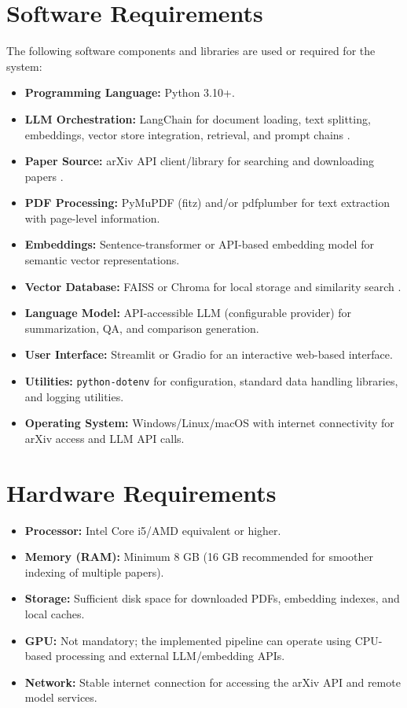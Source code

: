 \section{Software Requirements}
The following software components and libraries are used or required for the system:
\begin{itemize}
    \item \textbf{Programming Language:} Python 3.10+.
    \item \textbf{LLM Orchestration:} LangChain for document loading, text splitting, embeddings, vector store integration, retrieval, and prompt chains \cite{b5,b6,b7}.
    \item \textbf{Paper Source:} arXiv API client/library for searching and downloading papers \cite{b12}.
    \item \textbf{PDF Processing:} PyMuPDF (fitz) and/or pdfplumber for text extraction with page-level information.
    \item \textbf{Embeddings:} Sentence-transformer or API-based embedding model for semantic vector representations.
    \item \textbf{Vector Database:} FAISS or Chroma for local storage and similarity search \cite{b10,b11}.
    \item \textbf{Language Model:} API-accessible LLM (configurable provider) for summarization, QA, and comparison generation.
    \item \textbf{User Interface:} Streamlit or Gradio for an interactive web-based interface.
    \item \textbf{Utilities:} \texttt{python-dotenv} for configuration, standard data handling libraries, and logging utilities.
    \item \textbf{Operating System:} Windows/Linux/macOS with internet connectivity for arXiv access and LLM API calls.
\end{itemize}

\section{Hardware Requirements}
\begin{itemize}
    \item \textbf{Processor:} Intel Core i5/AMD equivalent or higher.
    \item \textbf{Memory (RAM):} Minimum 8 GB (16 GB recommended for smoother indexing of multiple papers).
    \item \textbf{Storage:} Sufficient disk space for downloaded PDFs, embedding indexes, and local caches.
    \item \textbf{GPU:} Not mandatory; the implemented pipeline can operate using CPU-based processing and external LLM/embedding APIs.
    \item \textbf{Network:} Stable internet connection for accessing the arXiv API and remote model services.
\end{itemize}